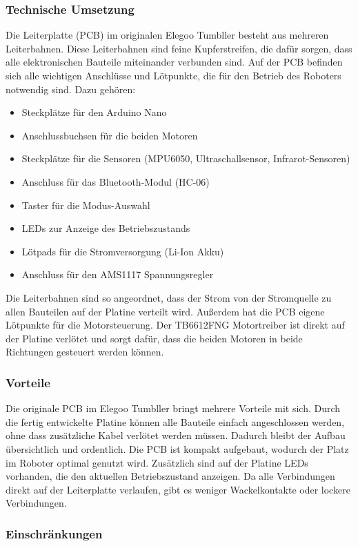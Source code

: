 \subsubsection{Technische Umsetzung}
Die Leiterplatte (PCB) im originalen Elegoo Tumbller besteht aus mehreren Leiterbahnen.
%
Diese Leiterbahnen sind feine Kupferstreifen,
die dafür sorgen,
dass alle elektronischen Bauteile miteinander verbunden sind.
%
Auf der PCB befinden sich alle wichtigen Anschlüsse und Lötpunkte,
die für den Betrieb des Roboters notwendig sind. Dazu gehören:
\begin{itemize}
    \item Steckplätze für den Arduino Nano
    \item Anschlussbuchsen für die beiden Motoren
    \item Steckplätze für die Sensoren (MPU6050, Ultraschallsensor, Infrarot-Sensoren)
    \item Anschluss für das Bluetooth-Modul (HC-06)
    \item Taster für die Modus-Auswahl
    \item LEDs zur Anzeige des Betriebszustands
    \item Lötpads für die Stromversorgung (Li-Ion Akku)
    \item Anschluss für den AMS1117 Spannungsregler
\end{itemize}

Die Leiterbahnen sind so angeordnet,
dass der Strom von der Stromquelle zu allen Bauteilen auf der Platine verteilt wird.
%
Außerdem hat die PCB eigene Lötpunkte für die Motorsteuerung.
%
Der TB6612FNG Motortreiber ist direkt auf der Platine verlötet und sorgt dafür,
dass die beiden Motoren in beide Richtungen gesteuert werden können.
%
\subsubsection{Vorteile}
Die originale PCB im Elegoo Tumbller bringt mehrere Vorteile mit sich.
%
Durch die fertig entwickelte Platine können alle Bauteile einfach angeschlossen werden,
ohne dass zusätzliche Kabel verlötet werden müssen.
%
Dadurch bleibt der Aufbau übersichtlich und ordentlich.
%
Die PCB ist kompakt aufgebaut,
wodurch der Platz im Roboter optimal genutzt wird.
%
Zusätzlich sind auf der Platine LEDs vorhanden,
die den aktuellen Betriebszustand anzeigen.
%
Da alle Verbindungen direkt auf der Leiterplatte verlaufen,
gibt es weniger Wackelkontakte oder lockere Verbindungen.

\subsubsection{Einschränkungen}

